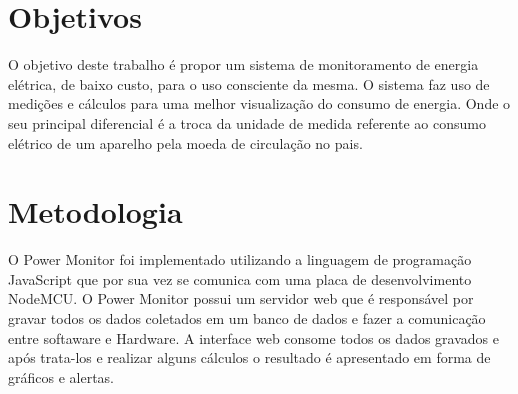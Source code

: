 \section{Objetivos}
O objetivo deste trabalho é propor um sistema de monitoramento de energia elétrica, de baixo custo, para o uso consciente da mesma. 
O sistema faz uso de medições e cálculos para uma melhor visualização do consumo de energia. Onde o seu principal diferencial é a troca da unidade de medida 
referente ao consumo elétrico de um aparelho pela moeda de circulação no pais.




\section{Metodologia}
O Power Monitor foi implementado utilizando a linguagem de programação JavaScript que por sua vez se comunica com uma placa de desenvolvimento NodeMCU. 
O Power Monitor possui um servidor web que é responsável por gravar todos os dados coletados em um banco de dados e fazer a comunicação entre softaware e Hardware. 
A interface web consome todos os dados gravados e após trata-los e realizar alguns cálculos o resultado é apresentado em forma de gráficos e alertas.


